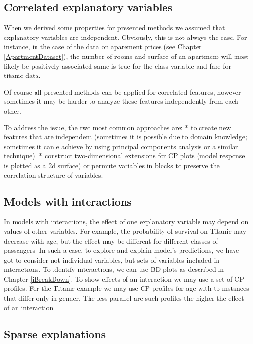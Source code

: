 \documentclass[12pt,]{krantz}
\begin{document}
\hypertarget{correlated-explanatory-variables}{%
\subsection{Correlated explanatory variables}\label{correlated-explanatory-variables}}

When we derived some properties for presented methods we assumed that explanatory variables are independent. Obviously, this is not always the case. For instance, in the case of the data on aparement prices (see Chapter \ref{ApartmentDataset}), the number of rooms and surface of an apartment will most likely be positively associated same is true for the class variable and fare for titanic data.

Of course all presented methods can be applied for correlated features, however sometimes it may be harder to analyze these features independently from each other.

To address the issue, the two most common approaches are:
* to create new features that are independent (sometimes it is possible due to domain knowledge; sometimes it can e achieve by using principal components analysis or a similar technique),
* construct two-dimensional extensions for CP plots (model response is plotted as a 2d surface) or permute variables in blocks to preserve the correlation structure of variables.

\hypertarget{models-with-interactions}{%
\subsection{Models with interactions}\label{models-with-interactions}}

In models with interactions, the effect of one explanatory variable may depend on values of other variables. For example, the probability of survival on Titanic may decrease with age, but the effect may be different for different classes of passengers.
In such a case, to explore and explain model's predictions, we have got to consider not individual variables, but sets of variables included in interactions. To identify interactions, we can use BD plots as described in Chapter \ref{iBreakDown}. To show effects of an interaction we may use a set of CP profiles. For the Titanic example we may use CP profiles for age with to instances that differ only in gender. The less parallel are such profiles the higher the effect of an interaction.

\hypertarget{sparse-explanations}{%
\subsection{Sparse explanations}\label{sparse-explanations}}
\end{document}
